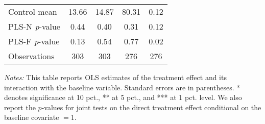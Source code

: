 \begin{table}[ht]
{\begin{threeparttable}
\begin{tabular}{l*{4}{c}}
Control mean    &    13.66         &    14.87         &    80.31         &     0.12         \\
PLS-N \emph{p}-value&     0.44         &     0.40         &     0.31         &     0.12         \\
PLS-F \emph{p}-value&     0.13         &     0.54         &     0.77         &     0.02         \\
Observations    &      303         &      303         &      276         &      276         \\
\bottomrule \end{tabular} \begin{tablenotes}[flushleft] \footnotesize \item \emph{Notes:} This table reports OLS estimates of the treatment effect and its interaction with the baseline variable. Standard errors are in parentheses. * denotes significance at 10 pct., ** at 5 pct., and *** at 1 pct. level. We also report the \(p\)-values for joint tests on the direct treatment effect conditional on the baseline covariate $= 1$. \end{tablenotes} \end{threeparttable} } \end{table}


